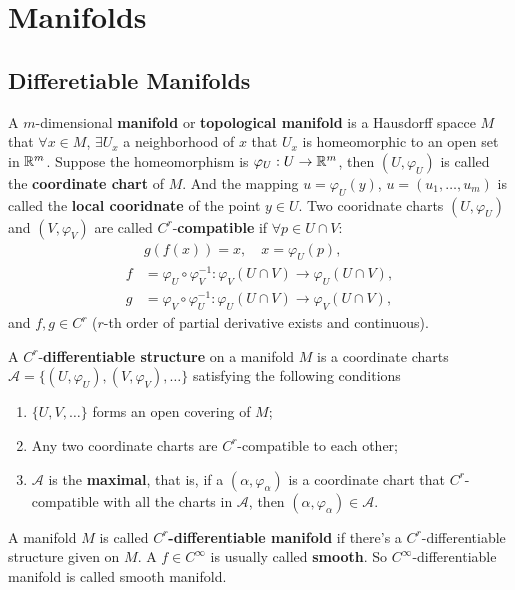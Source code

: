\section{Manifolds}

\subsection{Differetiable Manifolds}
\begin{definition}
A $m$-dimensional \textbf{manifold} or \textbf{topological manifold} is a Hausdorff spacce $M$ that $\forall x\in M$, $\exists U_x$ a neighborhood of $x$ that $U_x$ is homeomorphic to an open set in $\mathbb{R}^m$. Suppose the homeomorphism is $\varphi_U:U\to\mathbb{R}^m$, then $(U,\varphi_U)$ is called the \textbf{coordinate chart} of $M$. And the mapping $u=\varphi_U(y)$, $u=(u_1,\dots,u_m)$ is called the \textbf{local cooridnate} of the point $y\in U$. Two cooridnate charts $(U,\varphi_U)$ and $(V,\varphi_V)$ are called $C^r$-\textbf{compatible} if $\forall p\in U\cap V$:
\begin{equation}
\begin{aligned}
&g(f(x))=x,\quad x=\varphi_U(p),\\
f&=\varphi_U\circ\varphi_V^{-1}:\varphi_V(U\cap V)\to \varphi_U(U\cap V),\\
g&=\varphi_V\circ\varphi_U^{-1}:\varphi_U(U\cap V)\to \varphi_V(U\cap V),
\end{aligned}
\end{equation}
and $f,g\in C^r$ ($r$-th order of partial derivative exists and continuous). 
\end{definition} 

\begin{definition}
A $C^r$-\textbf{differentiable structure} on a manifold $M$ is a coordinate charts $\mathcal{A}=\{(U,\varphi_U),(V,\varphi_V),\dots\}$ satisfying the following conditions
\begin{enumerate}
\item $\{U,V,\dots\}$ forms an open covering of $M$;
\item Any two coordinate charts are $C^r$-compatible to each other;
\item $\mathcal{A}$ is the \textbf{maximal}, that is, if a $(\alpha,\varphi_\alpha)$ is a coordinate chart that $C^r$-compatible with all the charts in $\mathcal{A}$, then $(\alpha,\varphi_\alpha)\in\mathcal{A}$.
\end{enumerate}
A manifold $M$ is called $C^r$\textbf{-differentiable manifold} if there's a $C^r$-differentiable structure given on $M$. A $f\in C^\infty$ is usually called \textbf{smooth}. So $C^\infty$-differentiable manifold is called smooth manifold.
\end{definition}


